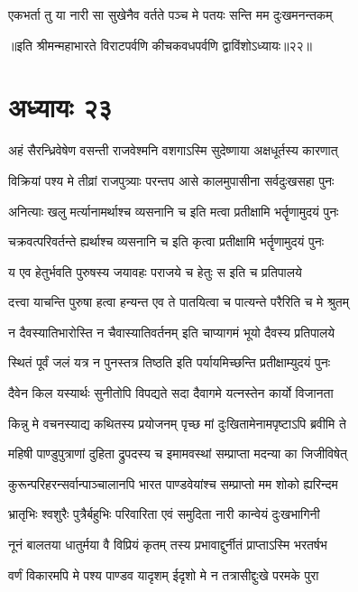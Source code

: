 \twolineshloka
{एकभर्ता तु या नारी सा सुखेनैव वर्तते}
{पञ्च मे पतयः सन्ति मम दुःखमनन्तकम्}

॥इति श्रीमन्महाभारते विराटपर्वणि कीचकवधपर्वणि द्वाविंशोऽध्यायः॥२२॥

\chapter{अध्यायः २३}


\twolineshloka
{अहं सैरन्ध्रिवेषेण वसन्ती राजवेश्मनि}
{वशगाऽस्मि सुदेष्णाया अक्षधूर्तस्य कारणात्}


\twolineshloka
{विक्रियां पश्य मे तीव्रां राजपुत्र्याः परन्तप}
{आसे कालमुपासीना सर्वदुःखसहा पुनः}


\twolineshloka
{अनित्याः खलु मर्त्यानामर्थाश्च व्यसनानि च}
{इति मत्वा प्रतीक्षामि भर्तॄणामुदयं पुनः}


\twolineshloka
{चक्रवत्परिवर्तन्ते ह्यर्थाश्च व्यसनानि च}
{इति कृत्वा प्रतीक्षामि भर्तॄणामुदयं पुनः}


\twolineshloka
{य एव हेतुर्भवति पुरुषस्य जयावहः}
{पराजये च हेतुः स इति च प्रतिपालये}


\twolineshloka
{दत्त्वा याचन्ति पुरुषा हत्वा हन्यन्त एव ते}
{पातयित्वा च पात्यन्ते परैरिति च मे श्रुतम्}


\twolineshloka
{न दैवस्यातिभारोस्ति न चैवास्यातिवर्तनम्}
{इति चाप्यागमं भूयो दैवस्य प्रतिपालये}


\twolineshloka
{स्थितं पूर्वं जलं यत्र न पुनस्तत्र तिष्ठति}
{इति पर्यायमिच्छन्ति प्रतीक्षाम्युदयं पुनः}


\twolineshloka
{दैवेन किल यस्यार्थः सुनीतोपि विपद्यते}
{सदा दैवागमे यत्नस्तेन कार्यो विजानता}


\twolineshloka
{किन्नु मे वचनस्याद्य कथितस्य प्रयोजनम्}
{पृच्छ मां दुःखितामेनामपृष्टाऽपि ब्रवीमि ते}


\twolineshloka
{महिषी पाण्डुपुत्राणां दुहिता द्रुपदस्य च}
{इमामवस्थां सम्प्राप्ता मदन्या का जिजीविषेत्}


\twolineshloka
{कुरून्परिहरन्सर्वान्पाञ्चालानपि भारत}
{पाण्डवेयांश्च सम्प्राप्तो मम शोको ह्यरिन्दम}


\twolineshloka
{भ्रातृभिः श्वशुरैः पुत्रैर्बहुभिः परिवारिता}
{एवं समुदिता नारी कान्वेयं दुःखभागिनी}


\twolineshloka
{नूनं बालतया धातुर्मया वै विप्रियं कृतम्}
{तस्य प्रभावाद्दुर्नीतं प्राप्ताऽस्मि भरतर्षभ}


\twolineshloka
{वर्णं विकारमपि मे पश्य पाण्डव यादृशम्}
{ईदृशो मे न तत्रासीद्दुःखे परमके पुरा}


